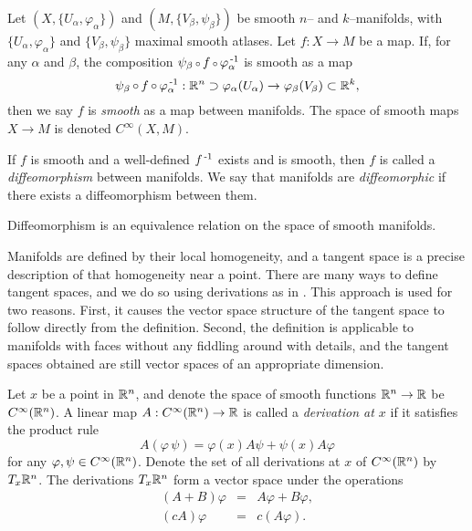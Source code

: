 \begin{defn}
	\label{def:smoothmap}
	Let $(X,\{U_\alpha,\varphi_\alpha\})$ and $(M,\{V_\beta,\psi_\beta\})$ be smooth $n$-- and $k$--manifolds, with $\{U_\alpha,\varphi_\alpha\}$ and $\{V_\beta,\psi_\beta\}$ maximal smooth atlases.
	Let $f:X\to M$ be a map.
	If, for any $\alpha$ and $\beta$, the composition $\psi_\beta\comp f\comp \varphi_\alpha\inv$ is smooth as a map $$\psi_\beta\comp f\comp \varphi_\alpha\inv:\R^n\supset\varphi_\alpha(U_\alpha)\to\varphi_\beta(V_\beta)\subset\R^k,$$ then we say $f$ is \emph{smooth} as a map between manifolds.
	The space of smooth maps $X\to M$ is denoted $C^\infty(X,M)$.
	
	If $f$ is smooth and a well-defined $f^{\,\text{-}1}$ exists and is smooth, then $f$ is called a \emph{diffeomorphism} between manifolds.
	We say that manifolds are \emph{diffeomorphic} if there exists a diffeomorphism between them.
\end{defn}

\begin{prop}
	\label{prop:diffeoequiv}
	Diffeomorphism is an equivalence relation on the space of smooth manifolds.
\end{prop}

Manifolds are defined by their local homogeneity, and a tangent space is a precise description of that homogeneity near a point.
There are many ways to define tangent spaces, and we do so using derivations as in \cite{Lee00}.
This approach is used for two reasons.
First, it causes the vector space structure of the tangent space to follow directly from the definition.
Second, the definition is applicable to manifolds with faces without any fiddling around with details, and the tangent spaces obtained are still vector spaces of an appropriate dimension.

\begin{defn}[Derivations on $\R^n$]
	Let $x$ be a point in $\R^n$, and denote the space of smooth functions $\mathbb{R}^n\to\mathbb{R}$ be $C^\infty(\mathbb{R}^n)$.
	A linear map $A:C^\infty(\mathbb{R}^n)\to\mathbb{R}$ is called a \emph{derivation at $x$} if it satisfies the product rule
	\[
		A(\varphi\,\psi)=\varphi(x)A\psi+\psi(x)A\varphi
	\]
	for any $\varphi,\psi\in C^\infty(\mathbb{R}^n)$.
	Denote the set of all derivations at $x$ of $C^\infty(\mathbb{R}^n)$ by $T_x \mathbb{R}^n$.
	The derivations $T_x \mathbb{R}^n$ form a vector space under the operations
	\[
		\begin{array}{rcl}
			(A+B)\varphi&=&A\varphi+B\varphi,\\
			(cA)\varphi&=&c(A\varphi).
		\end{array}
	\]
\end{defn}

